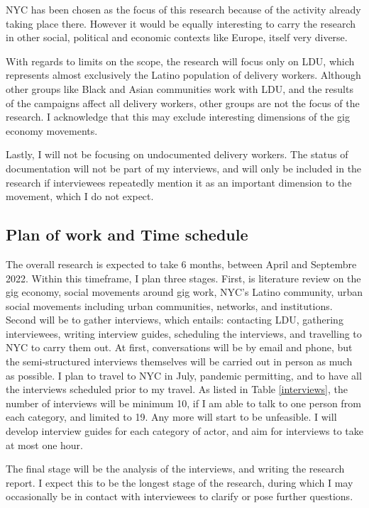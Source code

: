 \documentclass{article}[12pt]
\begin{document}
NYC has been chosen as the focus of this research because of the activity already taking place there. However it would be equally interesting to carry the research in other social, political and economic contexts like Europe, itself very diverse.

With regards to limits on the scope, the research will focus only on LDU, which represents almost exclusively the Latino population of delivery workers. Although other groups like Black and Asian communities work with LDU, and the results of the campaigns affect all delivery workers, other groups are not the focus of the research. I acknowledge that this may exclude interesting dimensions of the gig economy movements. 

Lastly, I will not be focusing on undocumented delivery workers. The status of documentation will not be part of my interviews, and will only be included in the research if interviewees repeatedly mention it as an important dimension to the movement, which I do not expect.

\subsection{Plan of work and Time schedule}

The overall research is expected to take 6 months, between April and Septembre 2022. Within this timeframe, I plan three stages. First, is literature review on the gig economy, social movements around gig work, NYC's Latino community, urban social movements including urban communities, networks, and institutions. Second will be to gather interviews, which entails: contacting LDU, gathering interviewees, writing interview guides, scheduling the interviews, and travelling to NYC to carry them out. At first, conversations will be by email and phone, but the semi-structured interviews themselves will be carried out in person as much as possible. I plan to travel to NYC in July, pandemic permitting, and to have all the interviews scheduled prior to my travel. As listed in Table \ref{interviews}, the number of interviews will be minimum 10, if I am able to talk to one person from each category, and limited to 19. Any more will start to be unfeasible. I will develop interview guides for each category of actor, and aim for interviews to take at most one hour. 

The final stage will be the analysis of the interviews, and writing the research report. I expect this to be the longest stage of the research, during which I may occasionally be in contact with interviewees to clarify or pose further questions. 
\end{document}
